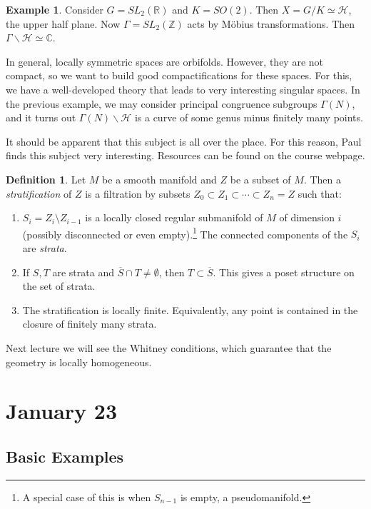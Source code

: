 \documentclass[leqno, openany]{memoir}
\theoremstyle{definition}
\newtheorem{defn}[thm]{Definition}
\newtheorem{exm}[thm]{Example}
\theoremstyle{remark}
\theoremstyle{plain}
\theoremstyle{definition}
\theoremstyle{remark}
\newcommand{\R}{\mathbb{R}}
\newcommand{\C}{\mathbb{C}}
\newcommand{\Z}{\mathbb{Z}}
\newcommand{\mc}[1]{\mathcal{#1}}
\begin{document}
\begin{exm}
    Consider $G = SL_2(\R)$ and $K = SO(2)$. Then $X = G/K \simeq \mc{H}$, the upper half plane. Now $\Gamma = SL_2(\Z)$ acts by M\"obius transformations. Then $\Gamma \backslash \mc{H} \simeq \C$.
\end{exm}

In general, locally symmetric spaces are orbifolds. However, they are not compact, so we want to build good compactifications for these spaces. For this, we have a well-developed theory that leads to very interesting singular spaces. In the previous example, we may consider principal congruence subgroups $\Gamma(N)$, and it turns out $\Gamma(N) \backslash \mc{H}$ is a curve of some genus minus finitely many points.

It should be apparent that this subject is all over the place. For this reason, Paul finds this subject very interesting. Resources can be found on the course webpage. 

\begin{defn}
    Let $M$ be a smooth manifold and $Z$ be a subset of $M$. Then a \textit{stratification} of $Z$ is a filtration by subsets $Z_0 \subset Z_1 \subset \cdots \subset Z_n = Z$ such that:
    \begin{enumerate}
        \item $S_i = Z_i \setminus Z_{i-1}$ is a locally closed regular submanifold of $M$ of dimension $i$ (possibly disconnected or even empty).\footnote{A special case of this is when $S_{n-1}$ is empty, a pseudomanifold.} The connected components of the $S_i$ are \textit{strata}.
        \item If $S,T$ are strata and $\overline{S} \cap T \neq \emptyset$, then $T \subset \overline{S}$. This gives a poset structure on the set of strata.
        \item The stratification is locally finite. Equivalently, any point is contained in the closure of finitely many strata.
    \end{enumerate}
\end{defn}

Next lecture we will see the Whitney conditions, which guarantee that the geometry is locally homogeneous.

\chapter{January 23}%
\label{cha:january_23}

\section{Basic Examples}%
\label{sec:basic_examples}
\end{document}
